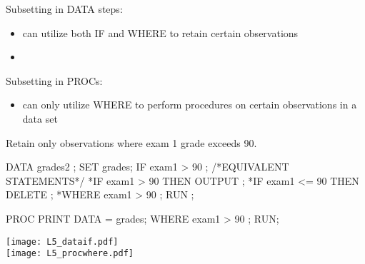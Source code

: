 \begin{frame}
Subsetting in DATA steps:
\begin{itemize}
\item can utilize both IF and WHERE to retain certain observations
\item[]
\end{itemize}

Subsetting in PROCs:
\begin{itemize}
\item can only utilize WHERE to perform procedures on certain observations in a data set
\end{itemize}
\end{frame}

\begin{frame}[fragile]
Retain only observations where exam 1 grade exceeds 90.\\
\vskip10pt
\hspace*{0.2in}
\footnotesize
\begin{code}{.0}
DATA grades2 ;
   SET grades;
   IF exam1 > 90 ;
   /*EQUIVALENT STATEMENTS*/
   *IF exam1 > 90 THEN OUTPUT ;
   *IF exam1 <= 90 THEN DELETE ;
   *WHERE exam1 > 90 ;
RUN ;

PROC PRINT DATA = grades;
	WHERE exam1 > 90 ;
RUN;
\end{code}
\emp
{} \hspace{0.1in} \emp
{}
\texttt{[image: L5\_dataif.pdf]}\\
\texttt{[image: L5\_procwhere.pdf]}
\emp\\
\end{frame}

